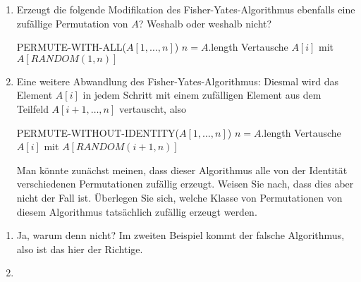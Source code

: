 
\begin{exercise}

\phantom{}

\begin{enumerate}[label = \alph*)]
  \item Erzeugt die folgende Modifikation des Fisher-Yates-Algorithmus ebenfalls
  eine zufällige Permutation von $A$? Weshalb oder weshalb nicht?

  \begin{algorithmic}
      \State PERMUTE-WITH-ALL($A[1,\dots,n]$)
      \State $n = A.$length
          \State Vertausche $A[i]$ mit $A[RANDOM(1,n)]$
      \EndFor
  \end{algorithmic}

  \item Eine weitere Abwandlung des Fisher-Yates-Algorithmus: Diesmal wird das
  Element $A[i]$ in jedem Schritt mit einem zufälligen Element aus dem Teilfeld
  $A[i+1,\dots,n]$ vertauscht, also

  \begin{algorithmic}
    \State PERMUTE-WITHOUT-IDENTITY($A[1,\dots,n]$)
    \State $n = A.$length
      \State Vertausche $A[i]$ mit $A[RANDOM(i+1,n)]$
    \EndFor
  \end{algorithmic}

  Man könnte zunächst meinen, dass dieser Algorithmus alle von der Identität
  verschiedenen Permutationen zufällig erzeugt. Weisen Sie nach, dass dies aber
  nicht der Fall ist. Überlegen Sie sich, welche Klasse von Permutationen von
  diesem Algorithmus tatsächlich zufällig erzeugt werden.
\end{enumerate}

\end{exercise}



\begin{solution}

\phantom{}

\begin{enumerate}[label = \alph*)]
  \item Ja, warum denn nicht? Im zweiten Beispiel kommt der falsche Algorithmus,
  also ist das hier der Richtige.
  \item
\end{enumerate}

\end{solution}
